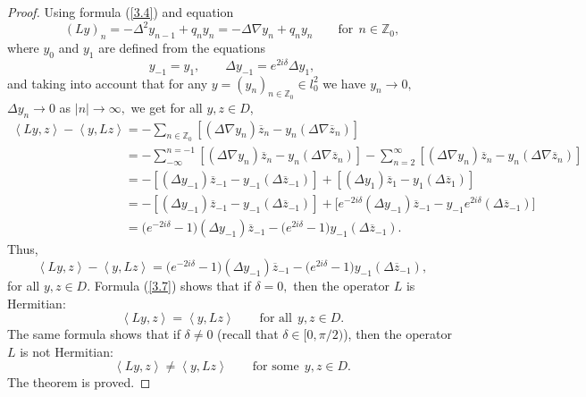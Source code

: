 \documentclass[pdftex]{sigma}
\numberwithin{equation}{section}
\begin{document}
\begin{proof}
Using formula (\ref{3.4}) and equation%
\begin{equation*}
\left( Ly\right) _{n}=-\Delta ^{2}y_{n-1}+q_{n}y_{n}=-\Delta \nabla
y_{n}+q_{n}y_{n}\qquad \text{for} \ \ n\in
\mathbb{Z}_{0},  %
\end{equation*}%
where $y_{0}$ and $y_{1}$ are def\/ined from the equations%
\begin{equation}
y_{-1}=y_{1},\qquad \Delta y_{-1}=e^{2i\delta }\Delta y_{1},
\label{3.6}
\end{equation}
and taking into account that for any $y=\left( y_{n}\right) _{n\in \mathbb{Z}
_{0}}\in l_{0}^{2}$ we have $y_{n}\rightarrow 0,$ $\Delta y_{n}\rightarrow 0$
as $\left\vert n\right\vert \rightarrow \infty ,$ we get for all $y,z\in D$,
\begin{gather*}
\left\langle Ly,z\right\rangle -\left\langle y,Lz\right\rangle =-\sum_{n\in
\mathbb{Z}
_{0}}\left[ (\Delta \nabla y_{n})\overline{z}_{n}-y_{n}(\Delta \nabla
\overline{z}_{n})\right]
\\
\phantom{\left\langle Ly,z\right\rangle -\left\langle y,Lz\right\rangle}{}
=-\sum_{-\infty }^{n=-1}\left[ (\Delta \nabla y_{n})\overline{z}%
_{n}-y_{n}(\Delta \nabla \overline{z}_{n})\right] -\sum_{n=2}^{\infty }\left[
(\Delta \nabla y_{n})\overline{z}_{n}-y_{n}(\Delta \nabla \overline{z}_{n})%
\right]
\\
\phantom{\left\langle Ly,z\right\rangle -\left\langle y,Lz\right\rangle}{}
=-[(\Delta y_{-1})\overline{z}_{-1}-y_{-1}(\Delta \overline{z}%
_{-1})]+[(\Delta y_{1})\overline{z}_{1}-y_{1}(\Delta \overline{z}_{1})]
\\
\phantom{\left\langle Ly,z\right\rangle -\left\langle y,Lz\right\rangle}{}
=-[(\Delta y_{-1})\overline{z}_{-1}-y_{-1}(\Delta \overline{z}%
_{-1})]+\big[e^{-2i\delta }(\Delta y_{-1})\overline{z}_{-1}-y_{-1}e^{2i\delta
}(\Delta \overline{z}_{-1})\big]
\\
\phantom{\left\langle Ly,z\right\rangle -\left\langle y,Lz\right\rangle}{}
=\big(e^{-2i\delta }-1\big)(\Delta y_{-1})\overline{z}_{-1}-\big(e^{2i\delta
}-1\big)y_{-1}(\Delta \overline{z}_{-1}).
\end{gather*}
Thus,%
\begin{equation}
\left\langle Ly,z\right\rangle -\left\langle y,Lz\right\rangle
=\big(e^{-2i\delta }-1\big)(\Delta y_{-1})\overline{z}_{-1}-\big(e^{2i\delta
}-1\big)y_{-1}(\Delta \overline{z}_{-1}),  \label{3.7}
\end{equation}%
for all $y,z\in D.$ Formula (\ref{3.7}) shows that if $\delta =0,$ then the
operator $L$ is Hermitian:%
\[
\left\langle Ly,z\right\rangle =\left\langle y,Lz\right\rangle \qquad \text{for all} \ \ y,z\in D.
\]%
The same formula shows that if $\delta \neq 0$ (recall that $\delta \in
\lbrack 0,\pi /2)$), then the operator $L$ is not Hermitian:%
\[
\left\langle Ly,z\right\rangle \neq \left\langle y,Lz\right\rangle \qquad \text{for some} \ \ y,z\in D.
\]%
The theorem is proved.
\end{proof}
\end{document}
